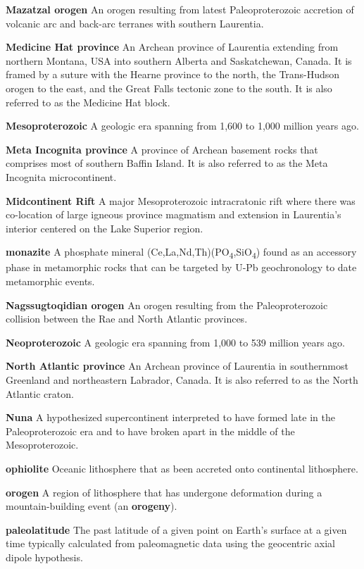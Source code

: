 \documentclass[twocolumn, switch]{article} %
\begin{document}
\noindent\textbf{Mazatzal orogen } An orogen resulting from latest Paleoproterozoic accretion of volcanic arc and back-arc terranes with southern Laurentia.

\noindent\textbf{Medicine Hat province } An Archean province of Laurentia extending from northern Montana, USA into southern Alberta and Saskatchewan, Canada. It is framed by a suture with the Hearne province to the north, the Trans-Hudson orogen to the east, and the Great Falls tectonic zone to the south. It is also referred to as the Medicine Hat block.

\noindent\textbf{Mesoproterozoic } A geologic era spanning from 1,600 to 1,000 million years ago.

\noindent\textbf{Meta Incognita province } A province of Archean basement rocks that comprises most of southern Baffin Island. It is also referred to as the Meta Incognita microcontinent.

\noindent\textbf{Midcontinent Rift } A major Mesoproterozoic intracratonic rift where there was co-location of large igneous province magmatism and extension in Laurentia's interior centered on the Lake Superior region.

\noindent\textbf{monazite } A phosphate mineral (Ce,La,Nd,Th)(PO\textsubscript{4},SiO\textsubscript{4}) found as an accessory phase in metamorphic rocks that can be targeted by U-Pb geochronology to date metamorphic events.

\noindent\textbf{Nagssugtoqidian orogen } An orogen resulting from the Paleoproterozoic collision between the Rae and North Atlantic provinces.

\noindent\textbf{Neoproterozoic } A geologic era spanning from 1,000 to 539 million years ago.

\noindent\textbf{North Atlantic province } An Archean province of Laurentia in southernmost Greenland and northeastern Labrador, Canada. It is also referred to as the North Atlantic craton.

\noindent\textbf{Nuna } A hypothesized supercontinent interpreted to have formed late in the Paleoproterozoic era and to have broken apart in the middle of the Mesoproterozoic.

\noindent\textbf{ophiolite } Oceanic lithosphere that as been accreted onto continental lithosphere.

\noindent\textbf{orogen } A region of lithosphere that has undergone deformation during a mountain-building event (an \textbf{orogeny}).

\noindent\textbf{paleolatitude } The past latitude of a given point on Earth's surface at a given time typically calculated from paleomagnetic data using the geocentric axial dipole hypothesis.
\end{document}
